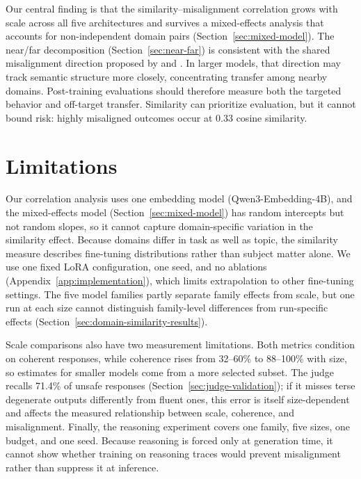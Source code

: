 \documentclass{article}
\begin{document}
Our central finding is that the similarity--misalignment correlation grows with scale across all five architectures and survives a mixed-effects analysis that accounts for non-independent domain pairs (Section~\ref{sec:mixed-model}). The near/far decomposition (Section~\ref{sec:near-far}) is consistent with the shared misalignment direction proposed by \citet{soligo2025convergent} and \citet{wang2025personafeaturescontrolemergent}. In larger models, that direction may track semantic structure more closely, concentrating transfer among nearby domains. Post-training evaluations should therefore measure both the targeted behavior and off-target transfer. Similarity can prioritize evaluation, but it cannot bound risk: highly misaligned outcomes occur at 0.33 cosine similarity.

\section{Limitations}

Our correlation analysis uses one embedding model (Qwen3-Embedding-4B), and the mixed-effects model (Section~\ref{sec:mixed-model}) has random intercepts but not random slopes, so it cannot capture domain-specific variation in the similarity effect. Because domains differ in task as well as topic, the similarity measure describes fine-tuning distributions rather than subject matter alone. We use one fixed LoRA configuration, one seed, and no ablations (Appendix~\ref{app:implementation}), which limits extrapolation to other fine-tuning settings. The five model families partly separate family effects from scale, but one run at each size cannot distinguish family-level differences from run-specific effects (Section~\ref{sec:domain-similarity-results}).

Scale comparisons also have two measurement limitations. Both metrics condition on coherent responses, while coherence rises from 32--60\% to 88--100\% with size, so estimates for smaller models come from a more selected subset. The judge recalls 71.4\% of unsafe responses (Section~\ref{sec:judge-validation}); if it misses terse degenerate outputs differently from fluent ones, this error is itself size-dependent and affects the measured relationship between scale, coherence, and misalignment. Finally, the reasoning experiment covers one family, five sizes, one budget, and one seed. Because reasoning is forced only at generation time, it cannot show whether training on reasoning traces would prevent misalignment rather than suppress it at inference.
\end{document}
